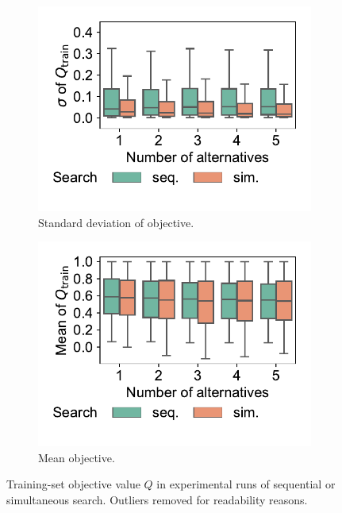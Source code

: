 \documentclass{article}
\theoremstyle{definition}
\begin{document}
\begin{figure}[htb]
	\centering
	\begin{subfigure}{0.48\textwidth}
		\centering
		\includegraphics[width=\textwidth, trim=15 25 15 15, clip]{plots/impact-search-stddev-objective.pdf}
		\caption{Standard deviation of objective.}
		\label{fig:afs:impact-search-stddev-objective}
	\end{subfigure}
	\hfill
	\begin{subfigure}{0.48\textwidth}
		\centering
		\includegraphics[width=\textwidth, trim=15 25 15 15, clip]{plots/impact-search-mean-objective.pdf}
		\caption{Mean objective.}
		\label{fig:afs:impact-search-mean-objective}
	\end{subfigure}
	\caption{Training-set objective value $Q$ in experimental runs of sequential or simultaneous search.
	Outliers removed for readability reasons.}
	\label{fig:afs:impact-search-objective}
\end{figure}
\end{document}
